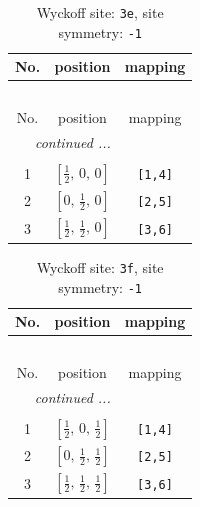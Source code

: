 \documentclass[fleqn,8pt]{jsarticle}
\begin{document}
\begin{longtable}{ccc}
\caption{Wyckoff site: {\tt 3e}, site symmetry: {\tt -1}}
 \\
 \hline \hline
No. & position & mapping \\ \hline \endfirsthead

\multicolumn{2}{l}{\tablename\ \thetable{}} \\
 \hline \hline
No. & position & mapping \\ \hline \endhead

 \hline \hline
\multicolumn{2}{r}{\footnotesize\it continued ...} \\ \endfoot

 \hline \hline
\multicolumn{2}{r}{} \\ \endlastfoot

1 & $\left[ \frac{1}{2},\, 0,\, 0 \right]$ & {\tt [1,4]} \\ \hline
2 & $\left[ 0,\, \frac{1}{2},\, 0 \right]$ & {\tt [2,5]} \\ \hline
3 & $\left[ \frac{1}{2},\, \frac{1}{2},\, 0 \right]$ & {\tt [3,6]} \\
\end{longtable}
\renewcommand{\arraystretch}{1.2}
\begin{longtable}{ccc}
\caption{Wyckoff site: {\tt 3f}, site symmetry: {\tt -1}}
 \\
 \hline \hline
No. & position & mapping \\ \hline \endfirsthead

\multicolumn{2}{l}{\tablename\ \thetable{}} \\
 \hline \hline
No. & position & mapping \\ \hline \endhead

 \hline \hline
\multicolumn{2}{r}{\footnotesize\it continued ...} \\ \endfoot

 \hline \hline
\multicolumn{2}{r}{} \\ \endlastfoot

1 & $\left[ \frac{1}{2},\, 0,\, \frac{1}{2} \right]$ & {\tt [1,4]} \\ \hline
2 & $\left[ 0,\, \frac{1}{2},\, \frac{1}{2} \right]$ & {\tt [2,5]} \\ \hline
3 & $\left[ \frac{1}{2},\, \frac{1}{2},\, \frac{1}{2} \right]$ & {\tt [3,6]} \\
\end{longtable}
\renewcommand{\arraystretch}{1.2}
\end{document}
